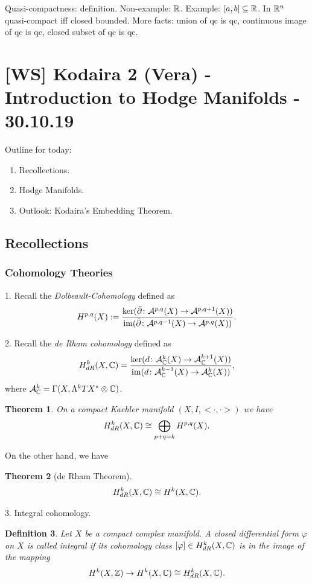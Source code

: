 \documentclass[A4paper, british, reqno]{amsart}
\theoremstyle{darkgreentheorem}
\newtheorem{thm}{Theorem}[section]
\theoremstyle{darkbluedefinition}
\newtheorem{defn}[thm]{Definition}
\theoremstyle{darkredexample}
\theoremstyle{remark}
\DeclareMathOperator{\im}{im}
\newcommand{\1}{\mathbbm{1}}
\newcommand{\ot}{\otimes}
\begin{document}
Quasi-compactness: definition.
Non-example: $\mathbb{R}$.
Example: $[a,b]\subseteq \mathbb{R}$.
In $\mathbb{R}^{n}$ quasi-compact iff closed bounded.
More facts: union of qc is qc, continuous image of qc is qc, closed subset of qc is qc.

\section{[WS] Kodaira 2 (Vera) - Introduction to Hodge Manifolds - 30.10.19}

Outline for today:
\begin{enumerate}[label=\arabic*)]
    \item Recollections.
    \item Hodge Manifolds.
    \item Outlook: Kodaira's Embedding Theorem.
\end{enumerate}

\subsection{Recollections}

\subsubsection{Cohomology Theories}

1. Recall the \textit{Dolbeault-Cohomology} defined as
\[ H^{p,q}(X):=\frac{\ker(\bar{\partial}\colon \calA^{p,q}(X)\to \calA^{p,q+1}(X))}{\im(\bar{\partial}\colon \calA^{p,q-1}(X)\to \calA^{p,q}(X))}.\]

2. Recall the \textit{de Rham cohomology} defined as
\[ H_{dR}^{k}(X,\C)=\frac{\ker(d\colon \calA_{\C}^{k}(X)\to \calA_{\C}^{k+1}(X))}{\im(d\colon \calA_{\C}^{k-1}(X)\to \calA_{\C}^{k}(X))}, \]
where $\calA_{\C}^{k}=\Gamma(X,\Lambda^{k}TX^{*}\ot \C)$.

\begin{thm}
    On a compact Kaehler manifold $(X,I,<\cdot,\cdot>)$ we have
    \[ H_{dR}^{k}(X,\mathbb{C})\cong \bigoplus_{p+q=k}H^{p,q}(X).\]
\end{thm}

On the other hand, we have

\begin{thm}[de Rham Theorem]
    \[ H_{dR}^{k}(X,\mathbb{C})\cong H^{k}(X,\mathbb{C}).\]
\end{thm}

3. Integral cohomology.

\begin{defn}
    Let $X$ be a compact complex manifold.
    A closed differential form $\varphi$ on $X$ is called \textit{integral} if its cohomology class $[\varphi]\in H^{k}_{dR}(X,\mathbb{C})$ is in the image of the mapping
    \[ H^{k}(X,\mathbb{Z})\to H^{k}(X,\mathbb{C})\cong H_{dR}^{k}(X,\mathbb{C}). \]
\end{defn}
\end{document}
